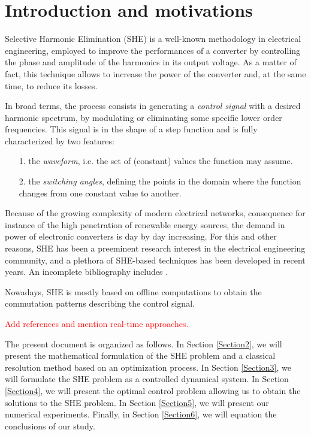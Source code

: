 \section{Introduction and motivations}\label{Section1}

Selective Harmonic Elimination (SHE) \cite{Rodriguez2002} is a well-known methodology in electrical engineering, employed to improve the performances of a converter by controlling the phase and amplitude of the harmonics in its output voltage. As a matter of fact, this technique allows to increase the power of the converter and, at the same time, to reduce its losses. 

In broad terms, the process consists in generating a \textit{control signal} with a desired harmonic spectrum, by modulating or eliminating some specific lower order frequencies. This signal is in the shape of a step function and is fully characterized by two features: 
\begin{itemize}
	\item[1.] the \textit{waveform}, i.e. the set of (constant) values the function may assume.
	\item[2.] the \textit{switching angles}, defining the points in the domain where the function changes from one constant value to another. 
\end{itemize}

Because of the growing complexity of modern electrical networks, consequence for instance of the high penetration of renewable energy sources, the demand in power of electronic converters is day by day increasing. For this and other reasons, SHE has been a preeminent research interest in the electrical engineering community, and a plethora of SHE-based techniques has been developed in recent years. An incomplete bibliography includes \cite{duranay2017selective,Janabi2020,Yang2017}.   

Nowadays, SHE is mostly based on offline computations to obtain the commutation patterns describing the control signal.  

\textcolor{red}{Add references and mention real-time approaches.}


The present document is organized as follows. In Section \ref{Section2}, we will present the mathematical formulation of the SHE problem and a classical resolution method based on an optimization process. In Section \ref{Section3}, we will formulate the SHE problem as a controlled dynamical system. In Section \ref{Section4}, we will present the optimal control problem allowing us to obtain the solutions to the SHE problem. In Section \ref{Section5}, we will present our numerical experiments. Finally, in Section \ref{Section6}, we will equation the conclusions of our study. 

